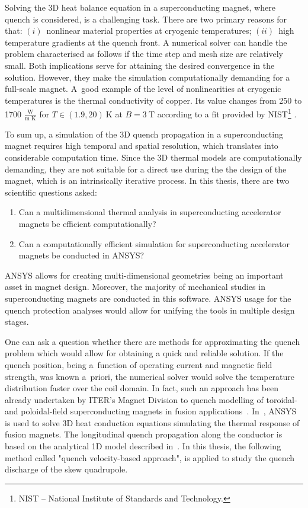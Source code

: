 
Solving the 3D heat balance equation in a superconducting magnet, where quench is considered, is a challenging task. There are two primary reasons for that: $(i)$~nonlinear material properties at cryogenic temperatures; $(ii)$~high temperature gradients at the quench front. A numerical solver can handle the problem characterised as follows if the time step and mesh size are relatively small. Both implications serve for attaining the desired convergence in the solution. However, they make the simulation computationally demanding for a full-scale magnet. A~good example of the level of nonlinearities at cryogenic temperatures is the thermal conductivity of copper. Its value changes from 250 to 1700 $\frac{\text{W}}{\text{m K}}$ for $T \in (1.9, 20)~\text{K}$ at $B=3~\text{T}$ according to a fit provided by NIST\footnote{NIST -- National Institute of Standards and Technology.} \cite[p.~9-13]{material_properties_roxie}. 

To sum up, a simulation of the 3D quench propagation in a superconducting magnet requires high temporal and spatial resolution, which translates into considerable computation time. Since the 3D thermal models are computationally demanding, they are not suitable for a direct use during the the design of the magnet, which is an intrinsically iterative process. In this thesis, there are two scientific questions asked:

\begin{enumerate}
\item Can a multidimensional thermal analysis in superconducting accelerator magnets be efficient computationally?
\item Can a computationally efficient simulation for superconducting accelerator magnets be conducted in ANSYS? 
\end{enumerate}

ANSYS allows for creating multi-dimensional geometries being an important asset in magnet design. Moreover, the majority of mechanical studies in superconducting magnets are conducted in this software. ANSYS usage for the quench protection analyses would allow for unifying the tools in multiple design stages.

One can ask a question whether there are methods for approximating the quench problem which would allow for obtaining a quick and reliable solution. If the quench position, being a~function of operating current and magnetic field strength, was known a~priori, the numerical solver would solve the temperature distribution faster over the coil domain. In fact, such an approach has been already undertaken by ITER's Magnet Division to quench modelling of toroidal- and poloidal-field superconducting magnets in fusion applications~\cite{iter_presentation_qualified_analysis}. In~\cite{iter_fault_case_study}, ANSYS is used to solve 3D heat conduction equations simulating the thermal response of fusion magnets. The longitudinal quench propagation along the conductor is based on the analytical 1D model described in~\cite{MIT_phd_thesis}. In this thesis, the following method called "quench velocity-based approach", is applied to study the quench discharge of the skew quadrupole.
